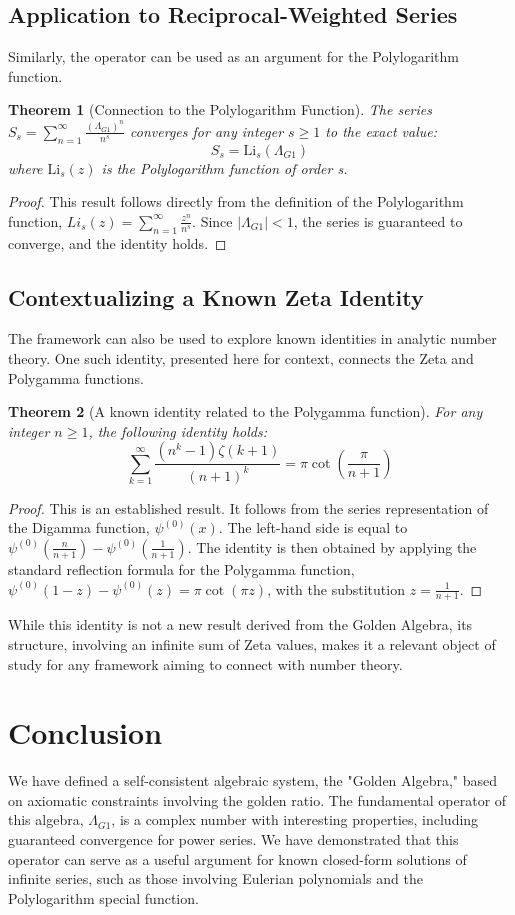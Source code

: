 \documentclass[12pt, letterpaper]{article}
\newtheorem{theorem}{Theorem}[section]
\newcommand{\LambdaG}{\Lambda_{G1}}
\begin{document}
\subsection{Application to Reciprocal-Weighted Series}
Similarly, the operator can be used as an argument for the Polylogarithm function.
\begin{theorem}[Connection to the Polylogarithm Function]
The series $S_s = \sum_{n=1}^{\infty} \frac{(\LambdaG)^{n}}{n^s}$ converges for any integer $s \ge 1$ to the exact value: $$S_s = \mathrm{Li}_s(\LambdaG)$$ where $\mathrm{Li}_s(z)$ is the Polylogarithm function of order s.
\end{theorem}
\begin{proof}
This result follows directly from the definition of the Polylogarithm function, $Li_s(z) = \sum_{n=1}^{\infty} \frac{z^n}{n^s}$. Since $|\LambdaG| < 1$, the series is guaranteed to converge, and the identity holds.
\end{proof}

\subsection{Contextualizing a Known Zeta Identity}
The framework can also be used to explore known identities in analytic number theory. One such identity, presented here for context, connects the Zeta and Polygamma functions.
\begin{theorem}[A known identity related to the Polygamma function]
For any integer $n\ge1$, the following identity holds:
$$\sum_{k=1}^{\infty}\frac{(n^{k}-1)\zeta(k+1)}{(n+1)^{k}}=\pi \cot\left(\frac{\pi}{n+1}\right)$$
\end{theorem}
\begin{proof}
This is an established result. It follows from the series representation of the Digamma function, $\psi^{(0)}(x)$. The left-hand side is equal to $\psi^{(0)}(\frac{n}{n+1}) - \psi^{(0)}(\frac{1}{n+1})$. The identity is then obtained by applying the standard reflection formula for the Polygamma function, $\psi^{(0)}(1-z)-\psi^{(0)}(z)=\pi \cot(\pi z)$, with the substitution $z = \frac{1}{n+1}$.
\end{proof}
While this identity is not a new result derived from the Golden Algebra, its structure, involving an infinite sum of Zeta values, makes it a relevant object of study for any framework aiming to connect with number theory.

\section{Conclusion}
We have defined a self-consistent algebraic system, the "Golden Algebra," based on axiomatic constraints involving the golden ratio. The fundamental operator of this algebra, $\LambdaG$, is a complex number with interesting properties, including guaranteed convergence for power series. We have demonstrated that this operator can serve as a useful argument for known closed-form solutions of infinite series, such as those involving Eulerian polynomials and the Polylogarithm special function.
\end{document}
